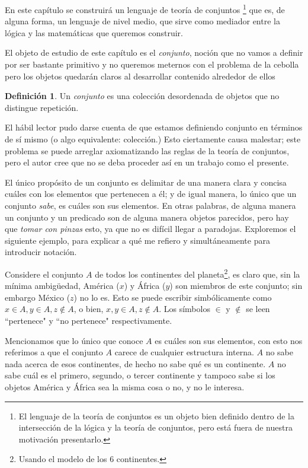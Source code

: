\documentclass{book}
\theoremstyle{definition}
\newtheorem{df}{Definición}[chapter]
\begin{document}
En este capítulo se construirá un lenguaje de teoría de conjuntos
\footnote{El lenguaje de la teoría de conjuntos es un objeto bien definido dentro de la intersección de la lógica y la teoría de conjuntos, pero está fuera de nuestra motivación presentarlo. %
}
que es, de alguna forma, un lenguaje de nivel medio, que sirve como mediador entre la lógica y las matemáticas que queremos construir.

El objeto de estudio de este capítulo es el \emph{conjunto}, noción que no vamos a definir por ser bastante primitivo y no queremos meternos con el problema de la cebolla %
pero los objetos quedarán claros al desarrollar contenido alrededor de ellos

\begin{df} %
	Un \emph{conjunto} es una colección desordenada de objetos que no distingue repetición.
\end{df}

El hábil lector pudo darse cuenta de que estamos definiendo conjunto en términos de sí mismo (o algo equivalente: colección.) Esto ciertamente causa malestar; este problema se puede arreglar axiomatizando las reglas de la teoría de conjuntos, pero el autor cree que no se deba proceder así en un trabajo como el presente.   %

El único propósito de un conjunto es delimitar de una manera clara y concisa cuáles con los elementos que pertenecen a él; y de igual manera, lo único que un conjunto \emph{sabe}, es cuáles son sus elementos.
En otras palabras, de alguna manera un conjunto y un predicado son de alguna manera objetos parecidos, pero hay que \emph{tomar con pinzas} esto, ya que no es difícil llegar a paradojas.
Exploremos el siguiente ejemplo, para explicar a qué me refiero y simultáneamente para introducir notación.

Considere el conjunto $A$ de todos los continentes del planeta\footnote{Usando el modelo de los 6 continentes.}, es claro que, sin la mínima ambigüedad, América ($x$) y África ($y$) son miembros de este conjunto; sin embargo México ($z$) no lo es.
Esto se puede escribir simbólicamente como $x \in A, y\in A, z \notin A$, o bien, $x,y\in A, z\notin A$. 
Los símbolos $\in$ y $\notin$ se leen ``pertenece" y ``no pertenece" respectivamente.

Mencionamos que lo único que conoce $A$ es cuáles son sus elementos, con esto nos referimos a que el conjunto $A$ carece de cualquier estructura interna. $A$ no sabe nada acerca de esos continentes, de hecho no sabe qué es un continente. $A$ no sabe cuál es el primero, segundo, o tercer continente y tampoco sabe si los objetos América y África sea la misma cosa o no, y no le interesa.
\end{document}
